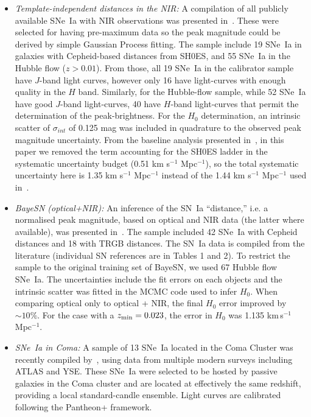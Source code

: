 \begin{itemize}
    \item \textit{Template-independent distances in the NIR:} A compilation of all publicly available SNe~Ia with NIR observations was presented in~\cite{2023AA...679A..95G}. These were selected for having pre-maximum data so the peak magnitude could be derived by simple Gaussian Process fitting. The sample include 19 SNe~Ia in galaxies with Cepheid-based distances from SH0ES, and 55 SNe~Ia in the Hubble flow ($z> 0.01$).
    From those, all 19 SNe~Ia in the calibrator sample have $J$-band light curves, however only 16 have light-curves with enough quality in the $H$ band. Similarly, for the Hubble-flow sample, while 52 SNe~Ia have good $J$-band light-curves, 40 have $H$-band light-curves that permit the determination of the peak-brightness. 
    For the $H_0$ determination, an intrinsic scatter of $\sigma_{int}$ of 0.125 mag was included in quadrature to the observed peak magnitude uncertainty. 
    From the baseline analysis presented in~\cite{2023AA...679A..95G}, in this paper we removed the term accounting for the SH0ES ladder in the systematic uncertainty budget (0.51 km s$^{-1}$ Mpc$^{-1}$), so the total systematic uncertainty here is 1.35 km s$^{-1}$ Mpc$^{-1}$ instead of the 1.44 km s$^{-1}$ Mpc$^{-1}$ used in~\cite{2023AA...679A..95G}.
    
    \item \textit{BayeSN (optical+NIR):} An inference of the SN~Ia ``distance,'' i.e. a normalised peak magnitude, based on optical and NIR data (the latter where available), was presented in~\citep{2023MNRAS.524..235D}. The sample included 42 SNe~Ia with Cepheid distances and 18 with TRGB distances. The SN~Ia data is compiled from the literature (individual SN references are in Tables 1 and 2). To restrict the sample to the original training set of BayeSN, we used 67 Hubble flow SNe~Ia. The uncertainties include the fit errors on each objects and the intrinsic scatter was fitted in the MCMC code used to infer $H_0$. When comparing optical only to optical + NIR, the final $H_0$ error improved by $\sim 10\%$. For the case with a $z_{\rm min} = 0.023$, the error in $H_0$ was 1.135 km\,s$^{-1}$\,Mpc$^{-1}$.
    
    \item \textit{SNe~Ia in Coma:} A sample of 13 SNe~Ia located in the Coma Cluster was recently compiled by~\citep{2025ApJ...979L...9S}, using data from multiple modern surveys including ATLAS and YSE. These SNe~Ia were selected to be hosted by passive galaxies in the Coma cluster and are located at effectively the same redshift, providing a local standard-candle ensemble. Light curves are calibrated following the Pantheon+ framework.
\end{itemize}

